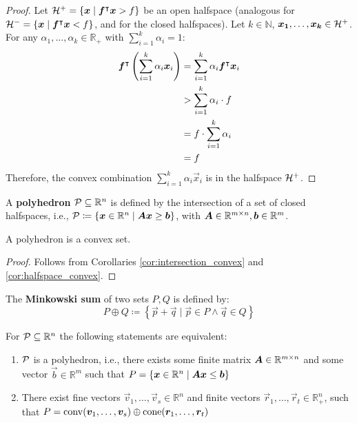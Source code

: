 \begin{proof}
Let $\mathcal{H}^+ = \{{\bm{x}} \mid {\bm{f}}^\intercal {\bm{x}} > f\}$ be an open halfspace (analogous for $\mathcal{H}^- = \{{\bm{x}} \mid {\bm{f}}^\intercal {\bm{x}} < f\}$, and for the closed halfspaces). Let $k \in \mathbb{N}$, ${\bm{x_1}}, \dots, {\bm{x_k}} \in \mathcal{H}^+$. For any $\alpha_1, \dots, \alpha_k \in \mathbb{R}_+$ with $\sum_{i=1}^{k} \alpha_i = 1$:
\begin{align*}
{\bm{f}}^\intercal \left( \sum_{i=1}^{k} \alpha_i {\bm{x}}_i \right)
&= \sum_{i=1}^{k} \alpha_i {\bm{f}}^\intercal {\bm{x}}_i \\
&> \sum_{i=1}^{k} \alpha_i \cdot f \\
&= f \cdot \sum_{i=1}^{k} \alpha_i \\
&= f
\end{align*}
Therefore, the convex combination $\sum_{i=1}^{k} \alpha_i \vec{x}_i$ is in the halfspace $\mathcal{H}^+$.
\end{proof}

\begin{definition}
A \textbf{polyhedron} $\mathcal{P} \subseteq \mathbb{R}^n$ is defined by the intersection of a set of closed halfspaces, i.e., $\mathcal{P} \coloneqq \{{\bm{x}} \in \mathbb{R}^n \mid {\bm{A}} {\bm{x}} \geq {\bm{b}}\}$, with ${\bm{A}} \in \mathbb{R}^{m \times n}, {\bm{b}} \in \mathbb{R}^m$.
\end{definition}

\begin{corollary}
A polyhedron is a convex set.
\end{corollary}

\begin{proof}
Follows from Corollaries \ref{cor:intersection_convex} and \ref{cor:halfspace_convex}.
\end{proof}

\begin{definition}
The \textbf{Minkowski sum} of two sets $P, Q$ is defined by:
\begin{equation*}
P \oplus Q \coloneqq \left\{\vec{p} + \vec{q} \mid \vec{p} \in P \land \vec{q} \in Q \right\}
\end{equation*}
\end{definition}

\begin{theorem}\label{th:minkowski-weyl}
For $\mathcal{P} \subseteq \mathbb{R}^n$ the following statements are equivalent:
\begin{enumerate}
\item $\mathcal{P}$ is a polyhedron, i.e., there exists some finite matrix ${\bm{A}} \in \mathbb{R}^{m \times n}$ and some vector $\vec{b} \in \mathbb{R}^m$ such that $P = \{{\bm{x}} \in \mathbb{R}^n \mid {\bm{A}} {\bm{x}} \leq {\bm{b}}\}$
\item There exist fine vectors $\vec{v}_1, \dots, \vec{v}_s \in \mathbb{R}^n$ and finite vectors $\vec{r}_1, \dots, \vec{r}_t \in \mathbb{R}_+^n$, such that $P = \operatorname{conv}({\bm{v}}_1, \dots, {\bm{v}}_s) \oplus \operatorname{cone}({\bm{r}}_1, \dots, {\bm{r}}_t)$
\end{enumerate}
\end{theorem}

